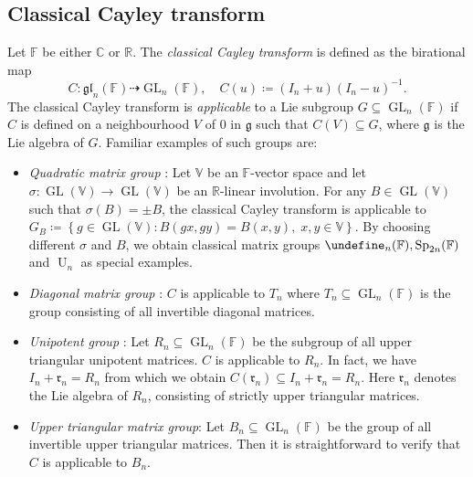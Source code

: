 \documentclass[11pt,reqno]{amsart}
\DeclareMathOperator{\GL}{GL}
\let\O\undefine
\DeclareMathOperator{\O}{O}
\DeclareMathOperator{\U}{U}
\DeclareMathOperator{\Sp}{Sp}
\begin{document}
\subsection*{Classical Cayley transform} Let $\mathbb{F}$ be either $\mathbb{C}$ or $\mathbb{R}$.  The \emph{classical Cayley transform} is defined as the birational map 
\begin{equation}\label{eq:classicalCayley}
C: \mathfrak{gl}_n(\mathbb{F})  \dasharrow \GL_n(\mathbb{F}),\quad C(u) \coloneqq (I_n + u)(I_n  - u)^{-1}.
\end{equation}
The classical Cayley transform is \emph{applicable} to a Lie subgroup $G \subseteq \GL_n(\mathbb{F})$ if $C$ is defined on a neighbourhood $V$ of $0$ in $\mathfrak{g}$ such that $C(V) \subseteq G$,  where $\mathfrak{g}$ is the Lie algebra of $G$.  Familiar examples of such groups are:
\begin{itemize}
\item[$\diamond$] \emph{Quadratic matrix group} \cite{Cayley1846,  Weyl39,  Weil60,Postnikov86}: Let $\mathbb{V}$ be an $\mathbb{F}$-vector space and let $\sigma: \GL(\mathbb{V}) \to \GL(\mathbb{V})$ be an $\mathbb{R}$-linear involution.  For any $B\in \GL(\mathbb{V})$ such that $\sigma(B) = \pm B$,  the classical Cayley transform is applicable to $G_B \coloneqq  \left\{g \in   \GL(\mathbb{V}): B(gx,gy) = B(x,y), \; x, y \in \mathbb{V} \right\}$.  By choosing different $\sigma$ and $B$,  we obtain classical matrix groups $\O_n(\mathbb{F}),  \Sp_{2n}(\mathbb{F})$ and $\U_n$ as special examples.
\item[$\diamond$] \emph{Diagonal matrix group} \cite[Example~1.20]{LPR06}: $C$ is applicable to $T_n$  where $T_n \subseteq \GL_n(\mathbb{F})$ is the group consisting of all invertible diagonal matrices.  
\item[$\diamond$] \emph{Unipotent group} \cite{BR85,KM03}: Let $R_n \subseteq \GL_n(\mathbb{F})$ be the subgroup of all upper triangular unipotent matrices.  $C$ is applicable to $R_n$.  In fact,  we have $I_n + \mathfrak{r}_n = R_n$ from which we obtain $C(\mathfrak{r}_n) \subseteq  I_n + \mathfrak{r}_n = R_n$.  Here $\mathfrak{r}_n$ denotes the Lie algebra of $R_n$,  consisting of strictly upper triangular matrices.
\item[$\diamond$] \emph{Upper triangular matrix group}: Let $B_n \subseteq \GL_n(\mathbb{F})$ be the group of all invertible upper triangular matrices.  Then it is straightforward to verify that $C$ is applicable to $B_n$. 
\end{itemize}
\end{document}

